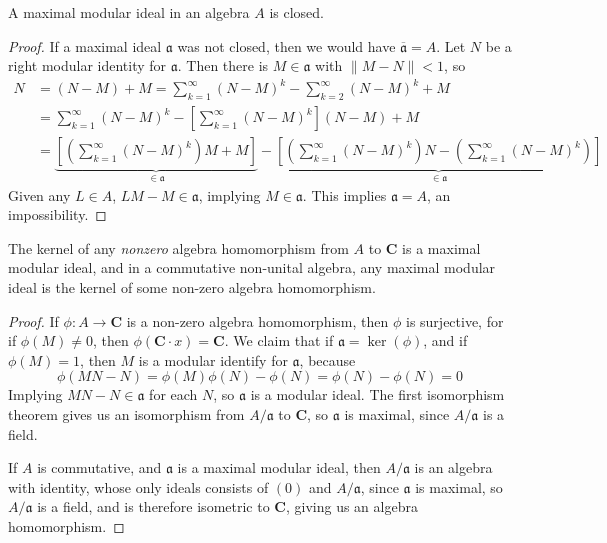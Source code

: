 \begin{lemma}
    A maximal modular ideal in an algebra $A$ is closed.
\end{lemma}
\begin{proof}
    If a maximal ideal $\mathfrak{a}$ was not closed, then we would have $\overline{\mathfrak{a}} = A$. Let $N$ be a right modular identity for $\mathfrak{a}$. Then there is $M \in \mathfrak{a}$ with $\| M - N \| < 1$, so
    \begin{align*}
        N &= (N - M) + M = \sum_{k = 1}^\infty (N - M)^k - \sum_{k = 2}^\infty (N - M)^k + M\\
        &= \sum_{k = 1}^\infty (N - M)^k - \left[ \sum_{k = 1}^\infty (N - M)^k \right] (N - M) + M\\
        &= \underbrace{\left[ \left( \sum_{k = 1}^\infty (N - M)^k \right) M + M \right]}_{\in \mathfrak{a}} - \underbrace{\left[ \left( \sum_{k = 1}^\infty (N - M)^k \right) N - \left( \sum_{k = 1}^\infty (N - M)^k \right) \right]}_{\in \mathfrak{a}}
    \end{align*}
    Given any $L \in A$, $LM - M \in \mathfrak{a}$, implying $M \in \mathfrak{a}$. This implies $\mathfrak{a} = A$, an impossibility.
\end{proof}

\begin{lemma}
    The kernel of any {\it nonzero} algebra homomorphism from $A$ to $\mathbf{C}$ is a maximal modular ideal, and in a commutative non-unital algebra, any maximal modular ideal is the kernel of some non-zero algebra homomorphism.
\end{lemma}
\begin{proof}
    If $\phi: A \to \mathbf{C}$ is a non-zero algebra homomorphism, then $\phi$ is surjective, for if $\phi(M) \neq 0$, then $\phi(\mathbf{C} \cdot x) = \mathbf{C}$. We claim that if $\mathfrak{a} = \ker(\phi)$, and if $\phi(M) = 1$, then $M$ is a modular identify for $\mathfrak{a}$, because
    \[ \phi(MN - N) = \phi(M)\phi(N) - \phi(N) = \phi(N) - \phi(N) = 0 \]
    Implying $MN - N \in \mathfrak{a}$ for each $N$, so $\mathfrak{a}$ is a modular ideal. The first isomorphism theorem gives us an isomorphism from $A/\mathfrak{a}$ to $\mathbf{C}$, so $\mathfrak{a}$ is maximal, since $A/\mathfrak{a}$ is a field.

    If $A$ is commutative, and $\mathfrak{a}$ is a maximal modular ideal, then $A/\mathfrak{a}$ is an algebra with identity, whose only ideals consists of $(0)$ and $A/\mathfrak{a}$, since $\mathfrak{a}$ is maximal, so $A/\mathfrak{a}$ is a field, and is therefore isometric to $\mathbf{C}$, giving us an algebra homomorphism.
\end{proof}

